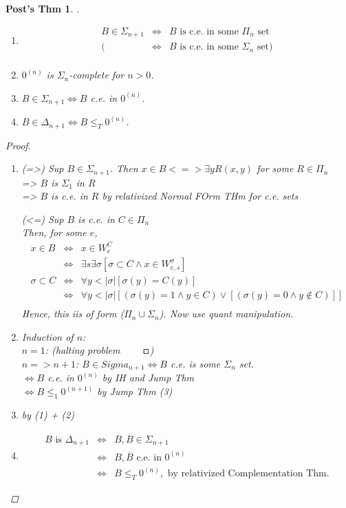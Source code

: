 \documentclass[12pt]{article}
\newcommand{\Conj}[1]{\ensuremath{\overline{#1}}}
\begin{document}
\newtheorem*{pthm}{Post's Thm}
\begin{pthm} .
\begin{enumerate}[(1)]
 \item 
  \begin{align*}
   B \in \Sigma_{n+1} &\Leftrightarrow& B \text{ is c.e. in some $\Pi_n$ set} \\
   (&\Leftrightarrow& B \text{ is c.e. in some $\Sigma_n$ set} )\\
  \end{align*}
 \item
  $0^{(n)}$ is $\Sigma_n$-complete for $n >0$.
 \item
  $B \in \Sigma_{n+1} \Leftrightarrow B$ c.e. in $0^{(n)}$.
 \item
  $B \in \Delta_{n+1} \Leftrightarrow B \le_T 0^{(n)}$.
\end{enumerate}
\begin{proof}
\begin{enumerate}[(1)]
 \item  (=>) Sup $B \in \Sigma_{n+1}$.
	Then $ x \in B <=> \exists y R(x,y)$ for some $ R \in \Pi_n$ \\
	=> $B$ is $\Sigma_1$ in $R$ \\
	=> $B$ is c.e. in $R$ by relativized Normal FOrm THm for c.e. sets

	(<=) Sup $B$ is c.e. in $C \in \Pi_n$ \\
	Then, for some $e$,
	\begin{align*}
	 x \in B &\Leftrightarrow& x \in W^C_e \\
		&\Leftrightarrow& \exists s \exists \sigma 
			[ \sigma \subset C \wedge x \in W^{\sigma}_{e,s} ] \\
	\sigma \subset C &\Leftrightarrow& \forall y < |\sigma| [ \sigma(y) = C(y) ] \\
		&\Leftrightarrow& \forall y < |\sigma| 
			[ (\sigma(y) = 1 \wedge y \in C) \vee [ (\sigma(y) = 0 \wedge y \not\in C) ] ] \\
	\end{align*}
	Hence, this iis of form ($\Pi_n \cup \Sigma_n$). Now use quant manipulation.
 \item Induction of $n$: \\
	$n = 1$: (halting problem $\qed$) \\
	$n => n+1$: $B \in Sigma_{n+1} \Leftrightarrow B$ c.e. is some $\Sigma_n$ set. \\
	$\Leftrightarrow B$ c.e. in $0^{(n)}$ by IH and Jump Thm \\
	$\Leftrightarrow B \le_1  0^{(n+1)}$ by Jump Thm (3)
 \item by (1) + (2)
 \item 
\begin{align*}
B \text{ is } \Delta_{n+1}  &\Leftrightarrow& B, \Conj{B} \in \Sigma_{n+1} \\
&\Leftrightarrow& B,\Conj{B} \text{ c.e. in } 0^{(n)} \\
&\Leftrightarrow& B \le_T 0^{(n)}, \text{ by relativized Complementation Thm}.
\end{align*}
\end{enumerate}
\end{proof}


\end{pthm}
\end{document}
